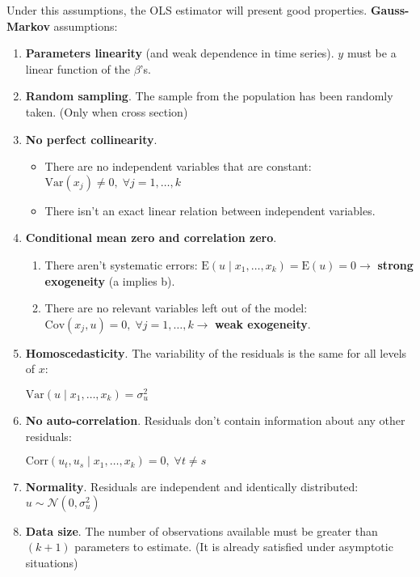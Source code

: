 \documentclass[10pt, a4paper, landscape]{article}
\newcommand{\E}{\mathrm{E}}
\newcommand{\Var}{\mathrm{Var}}
\newcommand{\Cov}{\mathrm{Cov}}
\newcommand{\Corr}{\mathrm{Corr}}
\begin{document}
\begin{multicols}{3}
		Under this assumptions, the OLS estimator will present good properties. \textbf{Gauss-Markov} assumptions:
		
		\begin{enumerate}[leftmargin=*]
			\item \textbf{Parameters linearity} (and weak dependence in time series). $y$ must be a linear function of the $\beta$'s.
			\item \textbf{Random sampling}. The sample from the population has been randomly taken. (Only when cross section)
			\item \textbf{No perfect collinearity}.
			
			\begin{itemize}[leftmargin=*]
				\item There are no independent variables that are constant: $\Var(x_{j}) \neq 0, \; \forall j = 1, \ldots, k$
				\item There isn't an exact linear relation between independent variables.
			\end{itemize}
			
			\item \textbf{Conditional mean zero and correlation zero}.
			
			\begin{enumerate}[leftmargin=*, label=\alph{*}.]
				\item There aren't systematic errors: $\E(u \mid x_{1}, \ldots, x_{k}) = \E(u) = 0 \rightarrow$ \textbf{strong exogeneity} (a implies b).
				\item There are no relevant variables left out of the model: $\Cov(x_{j}, u) = 0, \; \forall j = 1, \ldots, k \rightarrow$ \textbf{weak exogeneity}.
			\end{enumerate}
			
			\item \textbf{Homoscedasticity}. The variability of the residuals is the same for all levels of $x$:
			
			$\Var(u \mid x_{1}, \ldots, x_{k}) = \sigma^{2}_{u}$
			
			\item \textbf{No auto-correlation}. Residuals don't contain information about any other residuals:
			
			$\Corr(u_{t}, u_{s} \mid x_{1}, \ldots, x_{k}) = 0, \; \forall t \neq s$
			
			\item \textbf{Normality}. Residuals are independent and identically distributed: $u \sim \mathcal{N}(0, \sigma^{2}_{u})$
			\item \textbf{Data size}. The number of observations available must be greater than $(k + 1)$ parameters to estimate. (It is already satisfied under asymptotic situations)
		\end{enumerate}
		

\end{multicols}
\end{document}
